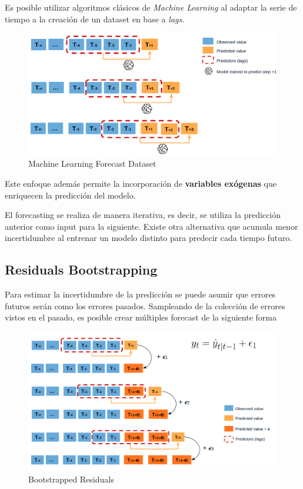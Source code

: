 Es posible utilizar algoritmos clásicos de \textit{Machine Learning} al adaptar la serie de tiempo a la creación de un dataset en base a \textit{lags}. 

\begin{figure}[H]
    \center
    \includegraphics[scale=0.15]{notebooks/TS/img/ml_forecast.png}
    \caption{Machine Learning Forecast Dataset}
\end{figure}

Este enfoque además permite la incorporación de \textbf{variables exógenas} que enriquecen la predicción del modelo.

El forecasting se realiza de manera iterativa, es decir, se utiliza la predicción anterior como input para la siguiente. Existe otra alternativa que acumula menor incertidumbre al entrenar un modelo distinto para predecir cada tiempo futuro.

\subsection{Residuals Bootstrapping}

Para estimar la incertidumbre de la predicción se puede asumir que errores futuros serán como los errores pasados. Sampleando de la colección de errores vistos en el pasado, es posible crear múltiples forecast de la siguiente forma 

\begin{figure}[H]
    \center
    \includegraphics[scale=0.16]{notebooks/TS/img/boostrapped_residuals.png}
    \caption{Bootstrapped Residuals}
\end{figure}

